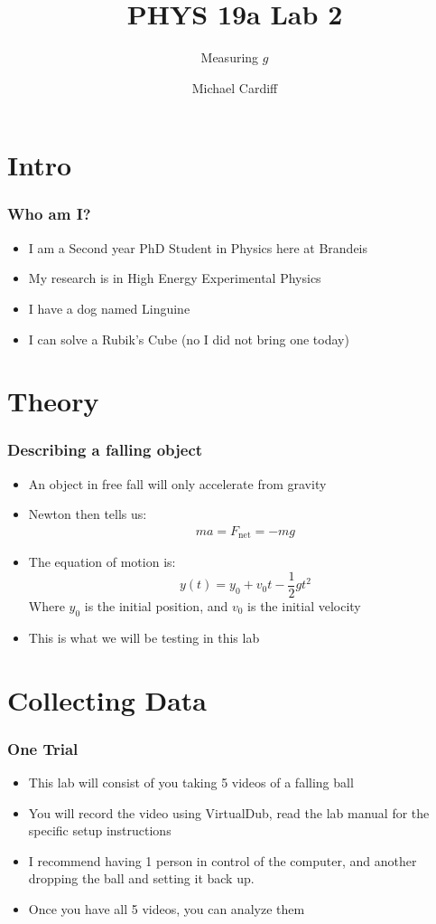 \documentclass[aspectratio=169]{beamer}
\title{PHYS 19a Lab 2}
\author{Michael Cardiff}
\subtitle{Measuring $g$}
\def\n{5 }
\begin{document}
\begin{frame}
  \titlepage
\end{frame}

\section{Intro}
\begin{frame}
  \frametitle{Who am I?}
  \begin{itemize}
  \item I am a Second year PhD Student in Physics here at Brandeis
  \item My research is in High Energy Experimental Physics
  \item I have a dog named Linguine
  \item I can solve a Rubik's Cube (no I did not bring one today)
  \end{itemize}
\end{frame}

\section{Theory}
\begin{frame}
  \frametitle{Describing a falling object}
  \begin{itemize}
  \item An object in free fall will only accelerate from gravity
  \item Newton then tells us:
    \begin{align*}
      ma=F_{\text{net}}=-mg
    \end{align*}
  \item The equation of motion is:
    \begin{equation}
      \label{eq:1}
      \boxed{y(t)=y_0+v_0t-\frac12gt^2}
    \end{equation}
    Where $y_0$ is the initial position, and $v_0$ is the initial velocity
  \item This is what we will be testing in this lab
  \end{itemize}
\end{frame}

\section{Collecting Data}
\begin{frame}
  \frametitle{One Trial}
  \begin{itemize}
  \item This lab will consist of you taking \n videos of a falling ball
  \item You will record the video using VirtualDub, read the lab manual for the specific setup instructions
  \item I recommend having 1 person in control of the computer, and another dropping the ball and setting it back up.
  \item Once you have all \n videos, you can analyze them
  \end{itemize}
\end{frame}
\end{document}
